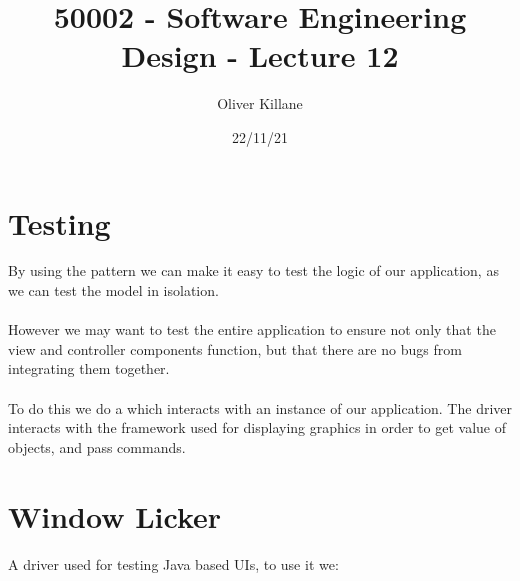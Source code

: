 \documentclass{report}
\title{50002 - Software Engineering Design - Lecture 12}
\author{Oliver Killane}
\date{22/11/21}
\begin{document}
    \maketitle

    \section*{Testing}
        By using the  pattern we can make it easy to test the logic of our application, as we can test the model in isolation.
        \\
        \\ However we may want to test the entire application to ensure not only that the view and controller components function, but that there are no bugs from integrating them together.
        \\
        \\ To do this we do a  which interacts with an instance of our application.
        The driver interacts with the framework used for displaying graphics in order to get value of objects, and pass commands.
    
    \section*{Window Licker}
        A driver used for testing Java based UIs, to use it we:
        \begin{enumerate}
        \end{enumerate}
    
\end{document}
